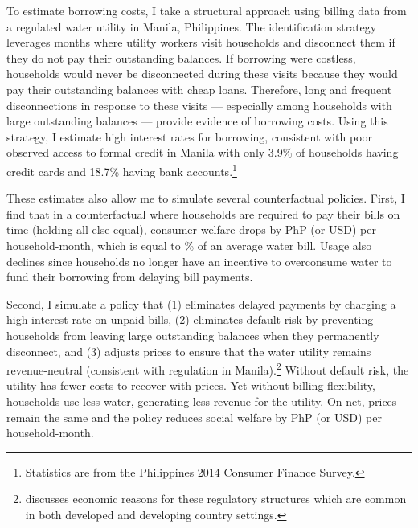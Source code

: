 \documentclass[12pt]{article}
\begin{document}
To estimate borrowing costs, I take a structural approach using billing data from a regulated water utility in Manila, Philippines.  The identification strategy leverages months where utility workers visit households and disconnect them if they do not pay their outstanding balances.  If borrowing were costless, households would never be disconnected during these visits because they would pay their outstanding balances with cheap loans.  Therefore, long and frequent disconnections in response to these visits --- especially among households with large outstanding balances --- provide evidence of borrowing costs.   Using this strategy, I estimate high interest rates for borrowing, consistent with poor observed access to formal credit in Manila with only 3.9\% of households having credit cards and 18.7\% having bank accounts.\footnote{Statistics are from the Philippines 2014 Consumer Finance Survey.}  

These estimates also allow me to simulate several counterfactual policies.  First, I find that in a counterfactual where households are required to pay their bills on time (holding all else equal), consumer welfare drops by PhP (or USD) per household-month, which is equal to \unskip\% of an average water bill.  Usage also declines since households no longer have an incentive to overconsume water to fund their borrowing from delaying bill payments.  

Second, I simulate a policy that (1) eliminates delayed payments by charging a high interest rate on unpaid bills, (2) eliminates default risk by preventing households from leaving large outstanding balances when they permanently disconnect, and (3) adjusts prices to ensure that the water utility remains revenue-neutral (consistent with regulation in Manila).\footnote{\cite{laffont2005regulation} discusses economic reasons for these regulatory structures which are common in both developed and developing country settings.}  Without default risk, the utility has fewer costs to recover with prices. Yet without billing flexibility, households use less water, generating less revenue for the utility.  On net, prices remain the same and the policy reduces social welfare by PhP (or USD) per household-month.  
\end{document}
